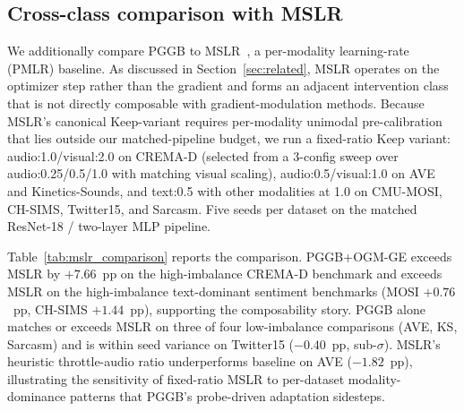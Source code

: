 \documentclass{article}
\begin{document}
\subsection{Cross-class comparison with MSLR}
\label{app:mslr}

We additionally compare PGGB to MSLR~\citep{yao2022mslr}, a per-modality learning-rate (PMLR) baseline. As discussed in Section~\ref{sec:related}, MSLR operates on the optimizer step rather than the gradient and forms an adjacent intervention class that is not directly composable with gradient-modulation methods. Because MSLR's canonical Keep-variant requires per-modality unimodal pre-calibration that lies outside our matched-pipeline budget, we run a fixed-ratio Keep variant: audio:1.0/visual:2.0 on CREMA-D (selected from a 3-config sweep over audio:0.25/0.5/1.0 with matching visual scaling), audio:0.5/visual:1.0 on AVE and Kinetics-Sounds, and text:0.5 with other modalities at 1.0 on CMU-MOSI, CH-SIMS, Twitter15, and Sarcasm. Five seeds per dataset on the matched ResNet-18 / two-layer MLP pipeline.

Table~\ref{tab:mslr_comparison} reports the comparison. PGGB+OGM-GE exceeds MSLR by $+7.66$~pp on the high-imbalance CREMA-D benchmark and exceeds MSLR on the high-imbalance text-dominant sentiment benchmarks (MOSI $+0.76$~pp, CH-SIMS $+1.44$~pp), supporting the composability story. PGGB alone matches or exceeds MSLR on three of four low-imbalance comparisons (AVE, KS, Sarcasm) and is within seed variance on Twitter15 ($-0.40$~pp, sub-$\sigma$). MSLR's heuristic throttle-audio ratio underperforms baseline on AVE ($-1.82$~pp), illustrating the sensitivity of fixed-ratio MSLR to per-dataset modality-dominance patterns that PGGB's probe-driven adaptation sidesteps.
\end{document}
